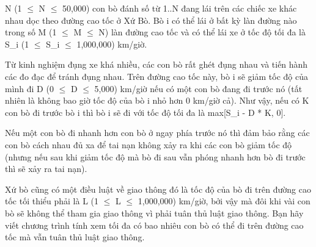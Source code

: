 N (1  $\le$  N  $\le$  50,000) con bò đánh số từ 1..N đang lái trên các  chiếc xe khác nhau dọc theo đường cao tốc ở Xứ Bò. Bò i có thể  lái ở bất kỳ làn đường nào trong số M (1  $\le$  M  $\le$  N) làn đường cao  tốc và có thể lái xe ở tốc độ tối đa là S\_i (1  $\le$  S\_i  $\le$  1,000,000) km/giờ.  

   Từ kinh nghiệm đụng xe khá nhiều, các con bò rất ghét đụng nhau  và tiến hành các đo đạc để tránh đụng nhau. Trên đường cao tốc này, bò  i sẽ giảm tốc độ của mình đi D (0 $\le$  D  $\le$  5,000) km/giờ nếu có  một con bò đang đi trước nó (tất nhiên là không bao giờ tốc độ của  bò i nhỏ hơn 0 km/giờ cả). Như vậy, nếu có K con bò đi trước bò i  thì bò i sẽ đi với tốc độ tối đa là max[S\_i - D * K, 0].  

   Nếu một  con bò đi nhanh hơn con bò ở ngay phía trước nó thì đảm bảo  rằng các con bò cách nhau đủ xa để tai nạn không xảy ra khi các con  bò giảm tốc độ (nhưng nếu sau khi giảm tốc độ mà bò đi sau vẫn  phóng nhanh hơn bò đi trước thì sẽ xảy ra tai nạn).  

   Xứ bò cũng có một điều luật về giao thông đó là tốc độ của bò  đi trên đường cao tốc tối thiểu phải là L (1  $\le$  L  $\le$  1,000,000) km/giờ, bởi  vậy mà đôi khi vài con bò sẽ không thể tham gia giao thông vì  phải tuân thủ luật giao thông. Bạn hãy viết chương trình  tính xem tối đa có bao nhiêu con bò có thể đi trên đường cao tốc mà vẫn  tuân thủ luật giao thông.  

\
